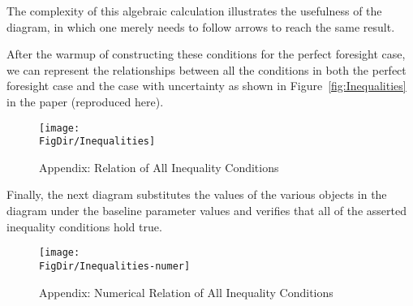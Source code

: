 \documentclass[\econtexRoot/BufferStockTheory]{subfiles}
\begin{document}
The complexity of this algebraic calculation illustrates the usefulness of the diagram, in which one merely needs to follow arrows to reach the same result.

After the warmup of constructing these conditions for the perfect foresight case, we can represent the relationships between all the conditions in both the perfect foresight case and the case with uncertainty as shown in Figure~\ref{fig:Inequalities} in the paper (reproduced here).

\begin{figure}[ht]
  \centerline{
    \texttt{[image: \\FigDir/Inequalities]}
  }
  \caption{Appendix: Relation of All Inequality Conditions}\label{fig:InequalitiesApp}
\end{figure}

Finally, the next diagram substitutes the values of the various objects in the diagram under the baseline parameter values and verifies that all of the asserted inequality conditions hold true.
\begin{figure}[ht]
  \centerline{
    \texttt{[image: \\FigDir/Inequalities-numer]}
  }
  \caption{Appendix: Numerical Relation of All Inequality Conditions}\label{fig:InequalitiesAppNumer}
\end{figure}

\onlyinsubfile{\pagebreak}
\end{document}
